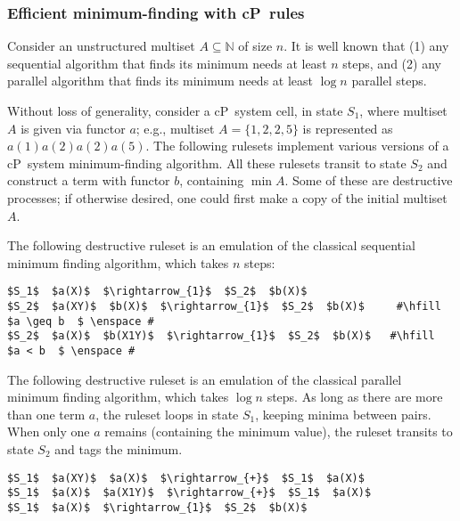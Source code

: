 
\subsubsection{Efficient minimum-finding with cP~rules}\label{sec-min}

Consider an unstructured multiset $A \subseteq \mathbb{N}$ of size $n$. 
It is well known that (1) any sequential algorithm that finds its minimum needs at least $n$ steps, and 
(2) any parallel algorithm that finds its minimum needs at least $\log n$ parallel steps.

Without loss of generality, consider a cP~system cell, in state $S_1$, where multiset $A$ is given via functor $a$; 
e.g., multiset $A = \{ 1, 2, 2, 5 \}$ is represented as $a(1) a(2) a(2) a(5)$.
The following rulesets implement various versions of a cP~system minimum-finding algorithm.
All these rulesets transit to state $S_2$ and construct a term with functor $b$, containing $\min A$.
Some of these are destructive processes; if otherwise desired, one could first make a copy of the initial multiset $A$.

The following destructive ruleset is an emulation of the classical sequential minimum finding algorithm, which takes $n$ steps:

\lstset{xleftmargin=.5in, xrightmargin=.5in} 
\begin{lstlisting}
$S_1$  $a(X)$  $\rightarrow_{1}$  $S_2$  $b(X)$ 
$S_2$  $a(XY)$  $b(X)$  $\rightarrow_{1}$  $S_2$  $b(X)$     #\hfill  $a \geq b  $ \enspace #
$S_2$  $a(X)$  $b(X1Y)$  $\rightarrow_{1}$  $S_2$  $b(X)$   #\hfill  $a < b  $ \enspace #
\end{lstlisting}

The following destructive ruleset is an emulation of the classical parallel minimum finding algorithm, which takes $\log n$ steps.
As long as there are more than one term $a$, the ruleset loops in state $S_1$, keeping minima between pairs.
When only one $a$ remains (containing the minimum value), the ruleset transits to state $S_2$ and tags the minimum. 

\lstset{xleftmargin=.5in, xrightmargin=.5in} 
\begin{lstlisting}
$S_1$  $a(XY)$  $a(X)$  $\rightarrow_{+}$  $S_1$  $a(X)$     
$S_1$  $a(X)$  $a(X1Y)$  $\rightarrow_{+}$  $S_1$  $a(X)$    
$S_1$  $a(X)$  $\rightarrow_{1}$  $S_2$  $b(X)$  
\end{lstlisting}

